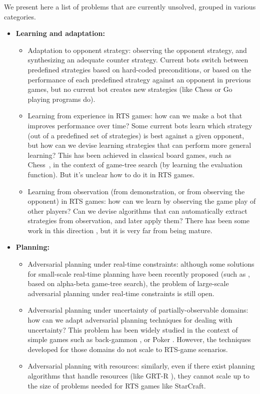 \documentclass[journal]{IEEEtran}
\begin{document}
We present here a list of problems that are currently unsolved, grouped in various categories.

\begin{itemize}

\item {\bf Learning and adaptation:}
\begin{itemize}
\item Adaptation to opponent strategy: observing the opponent strategy, and synthesizing an adequate counter strategy. Current bots switch between predefined strategies based on hard-coded preconditions, or based on the performance of each predefined strategy against an opponent in previous games, but no current bot creates new strategies (like Chess or Go playing programs do).
\item Learning from experience in RTS games: how can we make a bot that improves performance over time? Some current bots learn which strategy (out of a predefined set of strategies) is best against a given opponent, but how can we devise learning strategies that can perform more general learning? This has been achieved in classical board games, such as Chess~\cite{tesauro2001comparison}, in the context of game-tree search (by learning the evaluation function). But it's unclear how to do it in RTS games.
\item Learning from observation (from demonstration, or from observing the opponent) in RTS games: how can we learn by observing the game play of other players? Can we devise algorithms that can automatically extract strategies from observation, and later apply them? There has been some work in this direction \cite{OntanonMSR10}, but it is very far from being mature.
\end{itemize}

\item {\bf Planning:}
\begin{itemize}
\item Adversarial planning under real-time constraints: although some solutions for small-scale real-time planning have been recently proposed (such as \cite{churchill2012AIIDE}, based on alpha-beta game-tree search), the problem of large-scale adversarial planning under real-time constraints is still open.
\item Adversarial planning under uncertainty of partially-observable domains: how can we adapt adversarial planning techniques for dealing with uncertainty? This problem has been widely studied in the context of simple games such as back-gammon \cite{tesauro1994td}, or Poker \cite{rubin2011computer}. However, the techniques developed for those domains do not scale to RTS-game scenarios.
\item Adversarial planning with resources: similarly, even if there exist planning algorithms that handle resources (like GRT-R \cite{refanidis2000heuristic}), they cannot scale up to the size of problems needed for RTS games like StarCraft.
\end{itemize}


\end{itemize}
\end{document}
